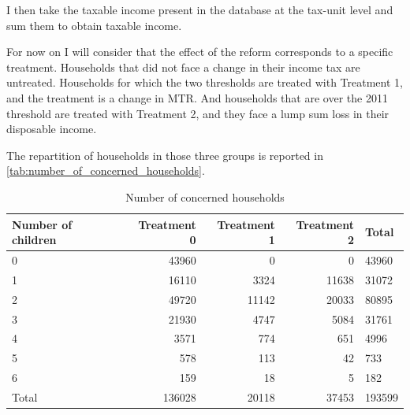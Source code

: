 \medskip





I then take the taxable income present in the database at the tax-unit level and sum them to obtain taxable income.

For now on I will consider that the effect of the reform corresponds to a specific treatment. Households that did not face a change in their income tax are untreated. Households for which the two thresholds are treated with Treatment 1, and the treatment is a change in MTR. And households that are over the 2011 threshold are treated with Treatment 2, and they face a lump sum loss in their disposable income.
  
  The repartition of households in those three groups is reported in \autoref{tab:number_of_concerned_households}.


  \begin{table}[H] %
    \caption{Number of concerned households}
  \label{tab:number_of_concerned_households}
\centering
\begin{tabular}{l|rrr|l|}
\toprule
   {Number of children} &                 Treatment 0 &                 Treatment 1  & Treatment 2 & Total\\
\midrule
0 &     43960      &     0    &         0       &      43960            \\
1 &     16110      & 3324       &  11638          &   31072             \\
2 &     49720      & 11142    &     20033       &      80895            \\
3 &     21930      & 4747       &  5084          &   31761             \\
4 &     3571      & 774         &  651            &    4996             \\
5 &     578        & 113         &  42            &    733              \\
6 &     159        & 18         &  5              &    182              \\

\hdrule
Total & 136028      &  20118     & 37453          &   193599        \\
\bottomrule
\end{tabular}

\end{table} 


          
         

